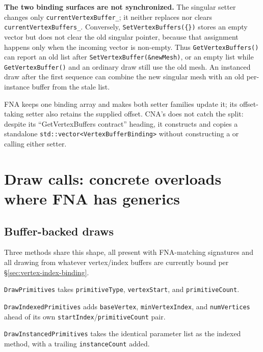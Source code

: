 \begin{sourcenote}
\textbf{The two binding surfaces are not synchronized.} The singular setter changes only
\texttt{currentVertexBuffer\_}; it neither replaces nor clears
\texttt{currentVertexBuffers\_}. Conversely, \texttt{SetVertexBuffers(\{\})} stores an empty
vector but does not clear the old singular pointer, because that assignment happens only when
the incoming vector is non-empty. Thus \texttt{GetVertexBuffers()} can report an old list after
\texttt{SetVertexBuffer(\&newMesh)}, or an empty list while \texttt{GetVertexBuffer()} and an
ordinary draw still use the old mesh. An instanced draw after the first sequence can combine
the new singular mesh with an old per-instance buffer from the stale list.

FNA keeps one binding array and makes both setter families update it; its offset-taking setter
also retains the supplied offset. CNA's
 does not catch the split: despite its
``GetVertexBuffers contract'' heading, it constructs and copies a standalone
\texttt{std::vector<VertexBufferBinding>} without constructing a
 or calling either setter.
\end{sourcenote}

\section{Draw calls: concrete overloads where FNA has generics}
\label{sec:draw-calls}

\subsection{Buffer-backed draws}

Three methods share this shape, all present with FNA-matching signatures and all drawing from
whatever vertex/index buffers are currently bound per \S\ref{sec:vertex-index-binding}.

\texttt{DrawPrimitives} takes \texttt{primitiveType}, \texttt{vertexStart}, and
\texttt{primitiveCount}.

\texttt{DrawIndexedPrimitives} adds \texttt{baseVertex}, \texttt{minVertexIndex}, and
\texttt{numVertices} ahead of its own \texttt{startIndex}/\texttt{primitiveCount} pair.

\texttt{Draw\allowbreak{}Instanced\allowbreak{}Primitives} takes the identical parameter list
as the indexed method, with a trailing \texttt{instanceCount} added.

